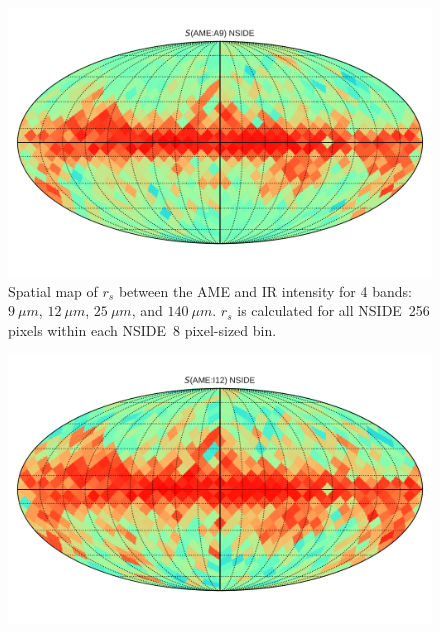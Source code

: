       \begin{figure}
        \includegraphics[width=\textwidth]{../Plots/Allsky_Corr/Spearman_Map_nside8_AMEtoA9.pdf}
        \centering
        \caption{Spatial map of $r_{s}$ between the AME and IR intensity for 4 bands:$9~\mu{}m$, $12~\mu{}m$, $25~\mu{}m$, and $140~\mu{}m$. $r_{s}$ is calculated for all NSIDE~256 pixels within each NSIDE~8 pixel-sized bin.}
        \label{fig:Spearman_Map_nside8_AMEtoIR}
      \end{figure}

      \begin{figure}

        \includegraphics[width=\textwidth]{../Plots/Allsky_Corr/Spearman_Map_nside8_AMEtoI12.pdf}
        \centering
        \caption{}
        \label{fig:Spearman_Map_nside8_AMEtoIR}
      \end{figure}

